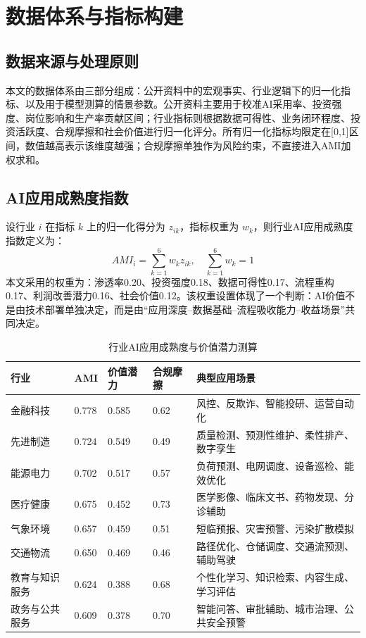 \documentclass[UTF8,a4paper,12pt]{ctexart}
\begin{document}
\section{数据体系与指标构建}
\subsection{数据来源与处理原则}
本文的数据体系由三部分组成：公开资料中的宏观事实、行业逻辑下的归一化指标、以及用于模型测算的情景参数。公开资料主要用于校准AI采用率、投资强度、岗位影响和生产率贡献区间；行业指标则根据数据可得性、业务闭环程度、投资活跃度、合规摩擦和社会价值进行归一化评分。所有归一化指标均限定在[0,1]区间，数值越高表示该维度越强；合规摩擦单独作为风险约束，不直接进入AMI加权求和。

\subsection{AI应用成熟度指数}
设行业 $i$ 在指标 $k$ 上的归一化得分为 $z_{ik}$，指标权重为 $w_k$，则行业AI应用成熟度指数定义为：
\[
AMI_i=\sum_{k=1}^6 w_k z_{ik},\quad \sum_{k=1}^6 w_k=1
\]
本文采用的权重为：渗透率0.20、投资强度0.18、数据可得性0.17、流程重构0.17、利润改善潜力0.16、社会价值0.12。该权重设置体现了一个判断：AI价值不是由技术部署单独决定，而是由“应用深度--数据基础--流程吸收能力--收益场景”共同决定。

\begin{table}[H]
\centering
\small
\renewcommand{\arraystretch}{1.18}
\begin{tabular}{p{} p{} p{} p{} p{}}
\toprule
行业 & AMI & 价值潜力 & 合规摩擦 & 典型应用场景 \\
\midrule
金融科技 & 0.778 & 0.585 & 0.62 & 风控、反欺诈、智能投研、运营自动化 \\
先进制造 & 0.724 & 0.549 & 0.49 & 质量检测、预测性维护、柔性排产、数字孪生 \\
能源电力 & 0.702 & 0.517 & 0.57 & 负荷预测、电网调度、设备巡检、能效优化 \\
医疗健康 & 0.675 & 0.452 & 0.73 & 医学影像、临床文书、药物发现、分诊辅助 \\
气象环境 & 0.657 & 0.459 & 0.51 & 短临预报、灾害预警、污染扩散模拟 \\
交通物流 & 0.650 & 0.469 & 0.46 & 路径优化、仓储调度、交通流预测、辅助驾驶 \\
教育与知识服务 & 0.624 & 0.388 & 0.68 & 个性化学习、知识检索、内容生成、学习评估 \\
政务与公共服务 & 0.609 & 0.378 & 0.70 & 智能问答、审批辅助、城市治理、公共安全预警 \\
\bottomrule
\end{tabular}
\caption{行业AI应用成熟度与价值潜力测算}
\label{tab:industry}
\end{table}
\end{document}
